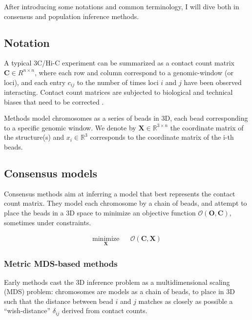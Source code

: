 \documentclass[letterpaper,12pt]{article}
\newcommand{\Xb}{\textbf{X}}
\newcommand{\RR}{\mathbb{R}}
\begin{document}
After introducing some notations and common terminology, I will dive both in consensus
and population inference methods.

\subsection*{Notation}

A typical 3C/Hi-C experiment can be summarized as a contact
count matrix $\mathbf{C} \in R^{n \times n}$, where each row and column
correspond to a genomic-window (or loci), and each entry $c_{ij}$ to the
number of times loci $i$ and $j$ have been observed interacting. Contact count
matrices are subjected to biological and technical biases that need to be
corrected \citep{imakaev:iterative, cournac:normalization, yaffe:probabilistic,
hu:hicnorm}.

Methods model chromosomes as a series of beads in 3D, each bead corresponding
to a specific genomic window. We denote by $\textbf{X} \in \RR^{3 \times n}$
the coordinate matrix of the structure(s) and $x_i \in \RR^3$ corresponds to
the coordinate matrix of the i-th beads.

\subsection*{Consensus models}

Consensus methods aim at inferring a model that best represents the contact
count matrix. They model each chromosome by a chain of beads, and attempt to
place the beads in a 3D space to minimize an objective function
$\mathcal{O}(\mathbf{O}, \mathbf{C})$, sometimes
under constraints.

\begin{equation*}
\renewcommand{\arraystretch}{2}
\begin{array}{ccl}
\underset{\Xb}{\text{minimize}} & & \mathcal{O}(\mathbf{C}, \Xb)
\end{array}
\end{equation*}

\subsubsection*{Metric MDS-based methods}

Early methods \citep{dekker:capturing, duan:three-dimensional,
tanizawa:mapping, ay:three-dimensional} cast the
3D inference problem as a multidimensional scaling (MDS) problem: chromosomes
are models as a chain of beads, to place in 3D such that the distance between
bead $i$ and $j$ matches as closely as possible a ``wish-distance''
$\delta_{ij}$ derived
from contact counts.
\end{document}
